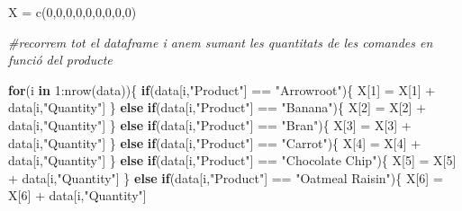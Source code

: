 \documentclass[
]{article}
\newenvironment{Shaded}{\begin{snugshade}}{\end{snugshade}}
\newcommand{\CommentTok}[1]{\textcolor[rgb]{0.56,0.35,0.01}{\textit{#1}}}
\newcommand{\ControlFlowTok}[1]{\textcolor[rgb]{0.13,0.29,0.53}{\textbf{#1}}}
\newcommand{\DecValTok}[1]{\textcolor[rgb]{0.00,0.00,0.81}{#1}}
\newcommand{\FunctionTok}[1]{\textcolor[rgb]{0.00,0.00,0.00}{#1}}
\newcommand{\NormalTok}[1]{#1}
\newcommand{\OtherTok}[1]{\textcolor[rgb]{0.56,0.35,0.01}{#1}}
\newcommand{\SpecialCharTok}[1]{\textcolor[rgb]{0.00,0.00,0.00}{#1}}
\newcommand{\StringTok}[1]{\textcolor[rgb]{0.31,0.60,0.02}{#1}}
\begin{document}
\begin{Shaded}
\begin{Highlighting}[]
\NormalTok{X }\OtherTok{=} \FunctionTok{c}\NormalTok{(}\DecValTok{0}\NormalTok{,}\DecValTok{0}\NormalTok{,}\DecValTok{0}\NormalTok{,}\DecValTok{0}\NormalTok{,}\DecValTok{0}\NormalTok{,}\DecValTok{0}\NormalTok{,}\DecValTok{0}\NormalTok{,}\DecValTok{0}\NormalTok{,}\DecValTok{0}\NormalTok{)}

\CommentTok{\#recorrem tot el dataframe i anem sumant les quantitats de les comandes en funció del producte}

\ControlFlowTok{for}\NormalTok{(i }\ControlFlowTok{in} \DecValTok{1}\SpecialCharTok{:}\FunctionTok{nrow}\NormalTok{(data))\{}
  \ControlFlowTok{if}\NormalTok{(data[i,}\StringTok{"Product"}\NormalTok{] }\SpecialCharTok{==} \StringTok{"Arrowroot"}\NormalTok{)\{}
\NormalTok{    X[}\DecValTok{1}\NormalTok{] }\OtherTok{=}\NormalTok{ X[}\DecValTok{1}\NormalTok{] }\SpecialCharTok{+}\NormalTok{ data[i,}\StringTok{"Quantity"}\NormalTok{]}
\NormalTok{  \}}
  \ControlFlowTok{else} \ControlFlowTok{if}\NormalTok{(data[i,}\StringTok{"Product"}\NormalTok{] }\SpecialCharTok{==} \StringTok{"Banana"}\NormalTok{)\{}
\NormalTok{    X[}\DecValTok{2}\NormalTok{] }\OtherTok{=}\NormalTok{ X[}\DecValTok{2}\NormalTok{] }\SpecialCharTok{+}\NormalTok{ data[i,}\StringTok{"Quantity"}\NormalTok{]}
\NormalTok{  \}}
  \ControlFlowTok{else} \ControlFlowTok{if}\NormalTok{(data[i,}\StringTok{"Product"}\NormalTok{] }\SpecialCharTok{==} \StringTok{"Bran"}\NormalTok{)\{}
\NormalTok{    X[}\DecValTok{3}\NormalTok{] }\OtherTok{=}\NormalTok{ X[}\DecValTok{3}\NormalTok{] }\SpecialCharTok{+}\NormalTok{ data[i,}\StringTok{"Quantity"}\NormalTok{]}
\NormalTok{  \}}
  \ControlFlowTok{else} \ControlFlowTok{if}\NormalTok{(data[i,}\StringTok{"Product"}\NormalTok{] }\SpecialCharTok{==} \StringTok{"Carrot"}\NormalTok{)\{}
\NormalTok{    X[}\DecValTok{4}\NormalTok{] }\OtherTok{=}\NormalTok{ X[}\DecValTok{4}\NormalTok{] }\SpecialCharTok{+}\NormalTok{ data[i,}\StringTok{"Quantity"}\NormalTok{]}
\NormalTok{  \}}
  \ControlFlowTok{else} \ControlFlowTok{if}\NormalTok{(data[i,}\StringTok{"Product"}\NormalTok{] }\SpecialCharTok{==} \StringTok{"Chocolate Chip"}\NormalTok{)\{}
\NormalTok{    X[}\DecValTok{5}\NormalTok{] }\OtherTok{=}\NormalTok{ X[}\DecValTok{5}\NormalTok{] }\SpecialCharTok{+}\NormalTok{ data[i,}\StringTok{"Quantity"}\NormalTok{]}
\NormalTok{  \}}
  \ControlFlowTok{else} \ControlFlowTok{if}\NormalTok{(data[i,}\StringTok{"Product"}\NormalTok{] }\SpecialCharTok{==} \StringTok{"Oatmeal Raisin"}\NormalTok{)\{}
\NormalTok{    X[}\DecValTok{6}\NormalTok{] }\OtherTok{=}\NormalTok{ X[}\DecValTok{6}\NormalTok{] }\SpecialCharTok{+}\NormalTok{ data[i,}\StringTok{"Quantity"}\NormalTok{]}

\end{Highlighting}
\end{Shaded}
\end{document}
